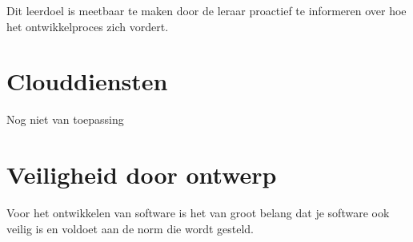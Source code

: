 Dit leerdoel is meetbaar te maken door de leraar proactief te informeren over hoe het ontwikkelproces zich vordert.





\section{Clouddiensten}\label{sec:clouddiensten}

Nog niet van toepassing




\section{Veiligheid door ontwerp}\label{sec:veiligheid-door-ontwerp}

Voor het ontwikkelen van software is het van groot belang dat je software ook veilig is en voldoet aan de norm die
wordt gesteld.

